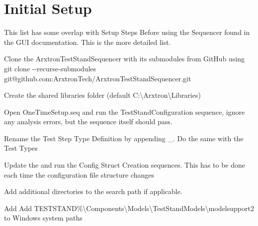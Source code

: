 \chapter{Initial Setup }
\hypertarget{initialize}{}\label{initialize}
This list has some overlap with Setup Steps Before using the Sequencer found in the GUI documentation. This is the more detailed list.


\begin{DoxyEnumerate}
\item Clone the Arxtron\+Test\+Stand\+Sequencer with its submodules from Git\+Hub using {\ttfamily git clone -\/-\/recurse-\/submodules git@github.\+com:\+Arxtron\+Tech/\+\+Arxtron\+Test\+Stand\+Sequencer.\+git} 
\item Create the shared libraries folder (default C:\+\textbackslash{}\+Arxtron\textbackslash{}\+Libraries) 
\item Open One\+Time\+Setup.seq and run the Test\+Stand\+Configuration sequence, ignore any analysis errors, but the sequence itself should pass. 
\item Rename the Test Step Type Definition by appending \+\_\+\+. Do the same with the Test Types 
\item Update the  and run the Config Struct Creation sequences. This has to be done each time the configuration file structure changes 
\item Add additional directories to the search path if applicable. 
\item Add Add {\ttfamily TESTSTAND\%\textbackslash{}Components\textbackslash{}Models\textbackslash{}Test\+Stand\+Models\textbackslash{}modelsupport2} to Windows system paths 
\end{DoxyEnumerate}
